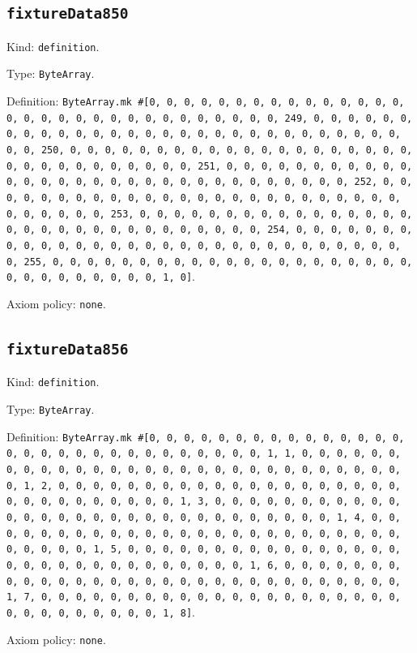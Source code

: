 \documentclass[11pt]{article}
\begin{document}
\subsection*{\texttt{fixtureData850}}
\noindent Kind: \texttt{definition}.\par
\noindent Type: \texttt{ByteArray}.\par
\noindent Definition: \texttt{ByteArray.mk \#[0, 0, 0, 0, 0, 0, 0, 0, 0, 0, 0, 0, 0, 0, 0, 0, 0, 0, 0, 0, 0, 0, 0, 0, 0, 0, 0, 0, 0, 0, 0, 249, 0, 0, 0, 0, 0, 0, 0, 0, 0, 0, 0, 0, 0, 0, 0, 0, 0, 0, 0, 0, 0, 0, 0, 0, 0, 0, 0, 0, 0, 0, 0, 250, 0, 0, 0, 0, 0, 0, 0, 0, 0, 0, 0, 0, 0, 0, 0, 0, 0, 0, 0, 0, 0, 0, 0, 0, 0, 0, 0, 0, 0, 0, 0, 251, 0, 0, 0, 0, 0, 0, 0, 0, 0, 0, 0, 0, 0, 0, 0, 0, 0, 0, 0, 0, 0, 0, 0, 0, 0, 0, 0, 0, 0, 0, 0, 252, 0, 0, 0, 0, 0, 0, 0, 0, 0, 0, 0, 0, 0, 0, 0, 0, 0, 0, 0, 0, 0, 0, 0, 0, 0, 0, 0, 0, 0, 0, 0, 253, 0, 0, 0, 0, 0, 0, 0, 0, 0, 0, 0, 0, 0, 0, 0, 0, 0, 0, 0, 0, 0, 0, 0, 0, 0, 0, 0, 0, 0, 0, 0, 254, 0, 0, 0, 0, 0, 0, 0, 0, 0, 0, 0, 0, 0, 0, 0, 0, 0, 0, 0, 0, 0, 0, 0, 0, 0, 0, 0, 0, 0, 0, 0, 255, 0, 0, 0, 0, 0, 0, 0, 0, 0, 0, 0, 0, 0, 0, 0, 0, 0, 0, 0, 0, 0, 0, 0, 0, 0, 0, 0, 0, 0, 0, 1, 0]}.\par
\noindent Axiom policy: \texttt{none}.\par
\subsection*{\texttt{fixtureData856}}
\noindent Kind: \texttt{definition}.\par
\noindent Type: \texttt{ByteArray}.\par
\noindent Definition: \texttt{ByteArray.mk \#[0, 0, 0, 0, 0, 0, 0, 0, 0, 0, 0, 0, 0, 0, 0, 0, 0, 0, 0, 0, 0, 0, 0, 0, 0, 0, 0, 0, 0, 0, 1, 1, 0, 0, 0, 0, 0, 0, 0, 0, 0, 0, 0, 0, 0, 0, 0, 0, 0, 0, 0, 0, 0, 0, 0, 0, 0, 0, 0, 0, 0, 0, 1, 2, 0, 0, 0, 0, 0, 0, 0, 0, 0, 0, 0, 0, 0, 0, 0, 0, 0, 0, 0, 0, 0, 0, 0, 0, 0, 0, 0, 0, 0, 0, 1, 3, 0, 0, 0, 0, 0, 0, 0, 0, 0, 0, 0, 0, 0, 0, 0, 0, 0, 0, 0, 0, 0, 0, 0, 0, 0, 0, 0, 0, 0, 0, 1, 4, 0, 0, 0, 0, 0, 0, 0, 0, 0, 0, 0, 0, 0, 0, 0, 0, 0, 0, 0, 0, 0, 0, 0, 0, 0, 0, 0, 0, 0, 0, 1, 5, 0, 0, 0, 0, 0, 0, 0, 0, 0, 0, 0, 0, 0, 0, 0, 0, 0, 0, 0, 0, 0, 0, 0, 0, 0, 0, 0, 0, 0, 0, 1, 6, 0, 0, 0, 0, 0, 0, 0, 0, 0, 0, 0, 0, 0, 0, 0, 0, 0, 0, 0, 0, 0, 0, 0, 0, 0, 0, 0, 0, 0, 0, 1, 7, 0, 0, 0, 0, 0, 0, 0, 0, 0, 0, 0, 0, 0, 0, 0, 0, 0, 0, 0, 0, 0, 0, 0, 0, 0, 0, 0, 0, 0, 0, 1, 8]}.\par
\noindent Axiom policy: \texttt{none}.\par
\end{document}
